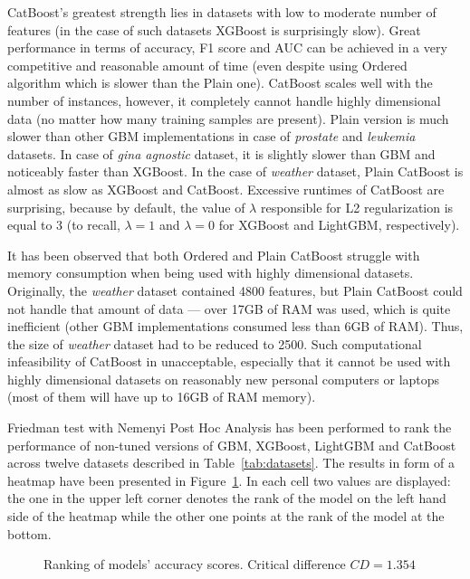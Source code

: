 \documentclass[magisterska, english]{pwr_wmat_praca_dyplomowa}
\theoremstyle{plain}
\numberwithin{theorem}{chapter}
\theoremstyle{definition}
\numberwithin{theorem}{chapter}
\newcommand{\gbm}{GBM, XGBoost, LightGBM and CatBoost }
\begin{document}
CatBoost's greatest strength lies in datasets with low to moderate number of features (in the case of such datasets XGBoost is surprisingly slow). Great performance in terms of accuracy, F1 score and AUC can be achieved in a very competitive and reasonable amount of time (even despite using Ordered algorithm which is slower than the Plain one). CatBoost scales well with the number of instances, however, it completely cannot handle highly dimensional data (no matter how many training samples are present). Plain version is much slower than other GBM implementations in case of \emph{prostate} and \emph{leukemia} datasets. In case of \emph{gina agnostic} dataset, it is slightly slower than GBM and noticeably faster than XGBoost. In the case of \emph{weather} dataset, Plain CatBoost is almost as slow as XGBoost and CatBoost. Excessive runtimes of CatBoost are surprising, because by default, the value of $\lambda$ responsible for L2 regularization is equal to 3 (to recall, $\lambda=1$ and $\lambda=0$ for XGBoost and LightGBM, respectively).

It has been observed that both Ordered and Plain CatBoost struggle with memory consumption when being used with highly dimensional datasets. Originally, the \emph{weather} dataset contained 4800 features, but Plain CatBoost could not handle that amount of data --- over 17GB of RAM was used, which is quite inefficient (other GBM implementations consumed less than 6GB of RAM). Thus, the size of \emph{weather} dataset had to be reduced to 2500. Such computational infeasibility of CatBoost in unacceptable, especially that it cannot be used with highly dimensional datasets on reasonably new personal computers or laptops (most of them will have up to 16GB of RAM memory). 

Friedman test with Nemenyi Post Hoc Analysis has been performed to rank the performance of non-tuned versions of \gbm across twelve datasets described in Table~\ref{tab:datasets}. The results in form of a heatmap have been presented in Figure~\ref{fig:no_tuning_accuracy_heatmap}. In each cell two values are displayed: the one in the upper left corner denotes the rank of the model on the left hand side of the heatmap while the other one points at the rank of the model at the bottom.

\begin{figure}[H]
	\centering
	\caption{Ranking of models' accuracy scores. Critical difference $CD = 1.354$}
	\label{fig:no_tuning_accuracy_heatmap}
\end{figure}
\end{document}
